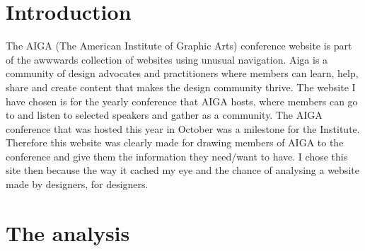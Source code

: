 \documentclass{article}
\begin{document}
    \section{Introduction}
	    The AIGA (The American Institute of Graphic Arts) conference website is part of the awwwards collection of websites using unusual navigation. Aiga is a community of design advocates and practitioners where members can learn, help, share and create content that makes the design community thrive. The website I have chosen is for the yearly conference that AIGA hosts, where members can go to and listen to selected speakers and gather as a community. The AIGA conference that was hosted this year in October was a milestone for the Institute. Therefore this website was clearly made for drawing members of AIGA to the conference and give them the information they need/want to have. I chose this site then because the way it cached my eye and the chance of analysing a website made by designers, for designers. 
    \section{The analysis}
\end{document}
